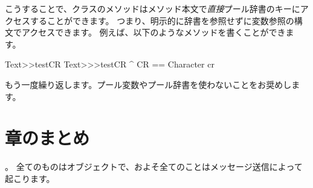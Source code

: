 \documentclass[a4paper,10pt,twoside]{book}
\begin{document}
こうすることで、クラスのメソッドはメソッド本文で\emph{直接}プール辞書のキーにアクセスすることができます。
つまり、明示的に辞書を参照せずに変数参照の構文でアクセスできます。
例えば、以下のようなメソッドを書くことができます。
  
\begin{method}[texttestcr]{Text>>testCR}
Text>>>testCR 	
      ^ CR == Character cr
\end{method}

もう一度繰り返します。プール変数やプール辞書を使わないことをお奨めします。

\section{章のまとめ}

。
全てのものはオブジェクトで、およそ全てのことはメッセージ送信によって起こります。
\end{document}
